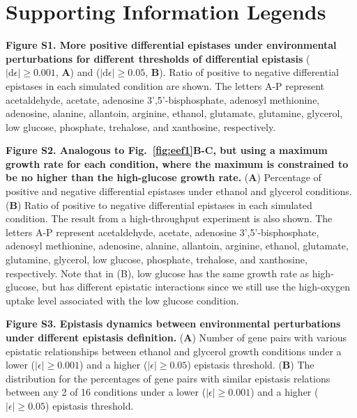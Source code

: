 \documentclass[10pt]{article}
\def\D{\mathrm{d}}
\newcommand{\Fig}{Fig.}
\begin{document}
\section*{Supporting Information Legends}
%
% 

\begin{description}
\item {\bf Figure S1. More positive differential epistases under environmental perturbations
for different thresholds of differential epistasis}
($\left|\D\epsilon\right| \geq 0.001$, \textbf{A}) and
($\left|\D\epsilon\right| \geq 0.05$, \textbf{B}). Ratio of positive
to negative differential epistases in each simulated condition are
shown. The letters A-P represent acetaldehyde, acetate, adenosine
3',5'-bisphosphate, adenosyl methionine, adenosine, alanine,
allantoin, arginine, ethanol, glutamate, glutamine, glycerol, low
glucose, phosphate, trehalose, and xanthosine, respectively.

\item {\bf Figure S2. Analogous to \Fig~\ref{fig:eef1}B-C, but using a
maximum growth rate for each condition, where the maximum is
constrained to be no higher than the high-glucose growth rate.}
(\textbf{A}) Percentage of positive and negative differential
epistases under ethanol and glycerol conditions. (\textbf{B}) Ratio of
positive to negative differential epistases in each simulated
condition. The result from a high-throughput experiment is also
shown. The letters A-P represent acetaldehyde, acetate, adenosine
3',5'-bisphosphate, adenosyl methionine, adenosine, alanine,
allantoin, arginine, ethanol, glutamate, glutamine, glycerol, low
glucose, phosphate, trehalose, and xanthosine, respectively. Note that
in (B), low glucose has the same growth rate as high-glucose, but has
different epistatic interactions since we still use the high-oxygen
uptake level associated with the low glucose condition.

\item {\bf Figure S3. Epistasis dynamics between environmental
perturbations under different epistasis definition.} (\textbf{A})
Number of gene pairs with various epistatic relationships between
ethanol and glycerol growth conditions under a lower
($\left|\epsilon\right| \geq 0.001$) and a higher
($\left|\epsilon\right| \geq 0.05$) epistasis threshold. (\textbf{B})
The distribution for the percentages of gene pairs with similar
epistasis relations between any 2 of 16 conditions under a lower
($\left|\epsilon\right| \geq 0.001$) and a higher
($\left|\epsilon\right| \geq 0.05$) epistasis threshold.


\end{description}
\end{document}
